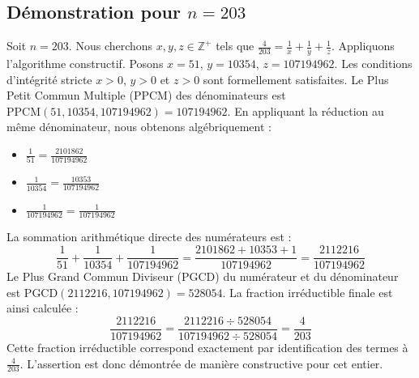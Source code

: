 \documentclass[11pt,a4paper]{article}
\begin{document}
\subsection{Démonstration pour $n = 203$}
Soit $n = 203$. Nous cherchons $x, y, z \in \mathbb{Z}^{+}$ tels que $\frac{4}{203} = \frac{1}{x} + \frac{1}{y} + \frac{1}{z}$.
Appliquons l'algorithme constructif. Posons $x = 51$, $y = 10354$, $z = 107194962$.
Les conditions d'intégrité stricte $x > 0$, $y > 0$ et $z > 0$ sont formellement satisfaites.
Le Plus Petit Commun Multiple (PPCM) des dénominateurs est $\text{PPCM}(51, 10354, 107194962) = 107194962$.
En appliquant la réduction au même dénominateur, nous obtenons algébriquement :
\begin{itemize}
    \item $\frac{1}{51} = \frac{2101862}{107194962}$
    \item $\frac{1}{10354} = \frac{10353}{107194962}$
    \item $\frac{1}{107194962} = \frac{1}{107194962}$
\end{itemize}
La sommation arithmétique directe des numérateurs est :
$$ \frac{1}{51} + \frac{1}{10354} + \frac{1}{107194962} = \frac{2101862 + 10353 + 1}{107194962} = \frac{2112216}{107194962} $$
Le Plus Grand Commun Diviseur (PGCD) du numérateur et du dénominateur est $\text{PGCD}(2112216, 107194962) = 528054$.
La fraction irréductible finale est ainsi calculée :
$$ \frac{2112216}{107194962} = \frac{2112216 \div 528054}{107194962 \div 528054} = \frac{4}{203} $$
Cette fraction irréductible correspond exactement par identification des termes à $\frac{4}{203}$. L'assertion est donc démontrée de manière constructive pour cet entier.
\end{document}
